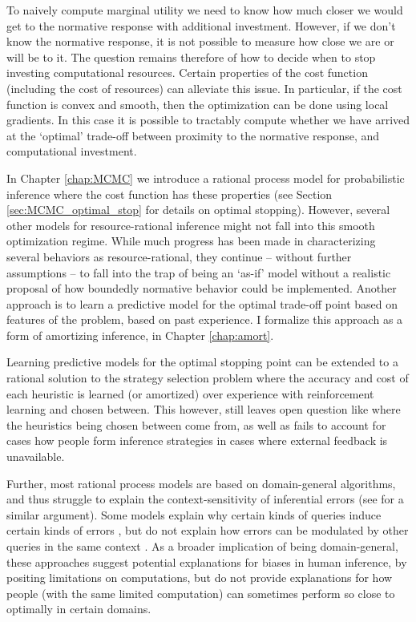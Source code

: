 To naively compute marginal utility we need to know how much closer we would get to the normative response with additional investment. However, if we don't know the normative response, it is not possible to measure how close we are or will be to it. The question remains therefore of how to decide when to stop investing computational resources. Certain properties of the cost function (including the cost of resources) can alleviate this issue. In particular, if the cost function is convex and smooth, then the optimization can be done using local gradients. In this case it is possible to tractably compute whether we have arrived at the `optimal' trade-off between proximity to the normative response, and computational investment.


In Chapter \ref{chap:MCMC} we introduce a rational process model for probabilistic inference where the cost function has these properties (see Section \ref{sec:MCMC_optimal_stop} for details on optimal stopping). However, several other models for resource-rational inference might not fall into this smooth optimization regime. \citep{horvitz1989reflection, russell1994provably, hay2014selecting} While much progress has been made in characterizing several behaviors as resource-rational, they continue -- without further assumptions -- to fall into the trap of being an `as-if' model without a realistic proposal of how boundedly normative behavior could be implemented. Another approach is to learn a predictive model for the optimal trade-off point based on features of the problem, based on past experience. I formalize this approach as a form of amortizing inference, in Chapter \ref{chap:amort}. 

Learning predictive models for the optimal stopping point can be extended to a rational solution to the strategy selection problem\citep{lieder2017strategy} where the accuracy and cost of each heuristic is learned (or amortized) over experience with reinforcement learning and chosen between. \citep{erev05, rieskamp06} This however, still leaves open question like where the heuristics being chosen between come from, as well as fails to account for cases how people form inference strategies in cases where external feedback is unavailable.

Further, most rational process models are based on domain-general algorithms, and thus struggle to explain the context-sensitivity of inferential errors (see \citet{mercier2017enigma} for a similar argument). Some models explain why certain kinds of queries induce certain kinds of errors \citep{dasgupta2017hypotheses}, but do not explain how errors can be modulated by other queries in the same context \citep{gershman2014amortized,dasgupta2018remembrance}. As a broader implication of being domain-general, these approaches suggest potential explanations for biases in human inference, by positing limitations on computations, but do not provide explanations for how people (with the same limited computation) can sometimes perform so close to optimally in certain domains.

